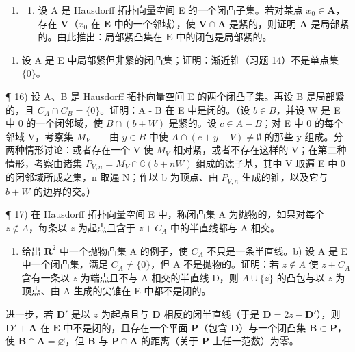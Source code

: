 \begin{enumerate}
\def\labelenumi{\arabic{enumi})}
\setcounter{enumi}{14}
\tightlist
\item
  \begin{enumerate}
  \def\labelenumii{\alph{enumii})}
  \tightlist
  \item
    设 A 是 Hausdorff 拓扑向量空间 E 的一个闭凸子集。若对某点 \(x_0 \in \mathbf{A}\)，存在 \(\mathbf{V}\)（\(x_0\) 在 \(\mathbf{E}\) 中的一个邻域），使 \(\mathbf{V} \cap \mathbf{A}\) 是紧的，则证明 \(\mathbf{A}\) 是局部紧的。由此推出：局部紧凸集在 \(\mathbf{E}\) 中的闭包是局部紧的。
  \end{enumerate}
\end{enumerate}

\begin{enumerate}
\def\labelenumi{\alph{enumi})}
\setcounter{enumi}{1}
\tightlist
\item
  设 A 是 E 中局部紧但非紧的闭凸集；证明：渐近锥（习题 14）不是单点集 \(\{0\}\)。
\end{enumerate}

¶ 16) 设 A、B 是 Hausdorff 拓扑向量空间 E 的两个闭凸子集。再设 B 是局部紧的，且 \(C_A \cap C_B = \{0\}\)。证明：A - B 在 E 中是闭的。（设 \(b \in B\)，并设 W 是 E 中 0 的一个闭邻域，使 \(B \cap (b + W)\) 是紧的。设 \(c \in \overline{A - B}\)；对 E 中 0 的每个邻域 V，考察集 \(M_V\)——由 \(y \in B\) 中使 \(A \cap (c + y + V) \neq \emptyset\) 的那些 y 组成。分两种情形讨论：或者存在一个 V 使 \(M_V\) 相对紧，或者不存在这样的 V；在第二种情形，考察由诸集 \(P_{V,n} = M_V \cap \complement (b + nW)\) 组成的滤子基，其中 V 取遍 E 中 0 的闭邻域所成之集，n 取遍 N；作以 b 为顶点、由 \(P_{V,n}\) 生成的锥，以及它与 \(b + W\) 的边界的交。）

¶ 17) 在 Hausdorff 拓扑向量空间 E 中，称闭凸集 A 为抛物的，如果对每个 \(z \notin A\)，每条以 \(z\) 为起点且含于 \(z + C_A\) 中的半直线都与 A 相交。

\begin{enumerate}
\def\labelenumi{\alph{enumi})}
\tightlist
\item
  给出 \(\mathbf{R}^2\) 中一个抛物凸集 A 的例子，使 \(C_A\) 不只是一条半直线。b) 设 A 是 E 中一个闭凸集，满足 \(C_A \neq \{0\}\)，但 A 不是抛物的。证明：若 \(z \notin A\) 使 \(z + C_A\) 含有一条以 \(z\) 为端点且不与 A 相交的半直线 D，则 \(A \cup \{z\}\) 的凸包与以 \(z\) 为顶点、由 A 生成的尖锥在 E 中都不是闭的。
\end{enumerate}

进一步，若 \(\mathbf{D}'\) 是以 \(z\) 为起点且与 \(\mathbf{D}\) 相反的闭半直线（于是 \(\mathbf{D} = 2z - \mathbf{D}'\)），则 \(\mathbf{D}' + \mathbf{A}\) 在 \(\mathbf{E}\) 中不是闭的，且存在一个平面 \(\mathbf{P}\)（包含 \(\mathbf{D}\)）与一个闭凸集 \(\mathbf{B} \subset \mathbf{P}\)，使 \(\mathbf{B} \cap \mathbf{A} = \varnothing\)，但 \(\mathbf{B}\) 与 \(\mathbf{P} \cap \mathbf{A}\) 的距离（关于 \(\mathbf{P}\) 上任一范数）为零。

